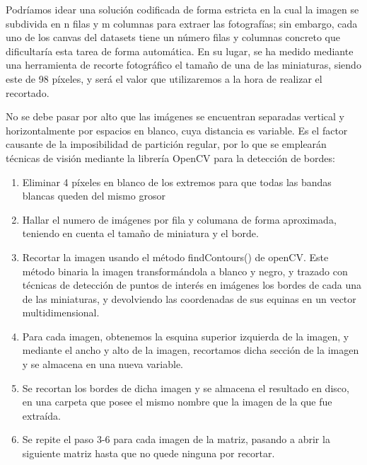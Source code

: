 Podríamos idear una solución codificada de forma estricta en la cual la imagen se subdivida en n filas y m columnas para extraer las fotografías; sin embargo, cada uno de los canvas del datasets tiene un número filas y columnas concreto que dificultaría esta tarea de forma automática. En su lugar, se ha medido mediante una herramienta de recorte fotográfico el tamaño de una de las miniaturas, siendo este de 98 píxeles, y será el valor que utilizaremos a la hora de realizar el recortado.

No se debe pasar por alto que las imágenes se encuentran separadas vertical y horizontalmente por espacios en blanco, cuya distancia es variable. Es el factor causante de la imposibilidad de partición regular, por lo que se emplearán técnicas de visión mediante la librería OpenCV para la detección de bordes:

\begin{enumerate}
	\item Eliminar 4 píxeles en blanco de los extremos para que todas las bandas blancas queden del mismo grosor
	\item Hallar el numero de imágenes por fila y columana de forma aproximada, teniendo en cuenta el tamaño de miniatura y el borde.
	\item Recortar la imagen usando el método findContours() de openCV. Este método binaria la imagen transformándola a blanco y negro, y trazado con técnicas de detección de puntos de interés en imágenes los bordes de cada una de las miniaturas, y devolviendo las coordenadas de sus equinas en un vector multidimensional. 
	\item Para cada imagen, obtenemos la esquina superior izquierda de la imagen, y mediante el ancho y alto de la imagen, recortamos dicha sección de la imagen y se almacena en una nueva variable.
	\item Se recortan los bordes de dicha imagen y se almacena el resultado en disco, en una carpeta que posee el mismo nombre que la imagen de la que fue extraída.
	\item Se repite el paso 3-6 para cada imagen de la matriz, pasando a abrir la siguiente matriz hasta que no quede ninguna por recortar.
\end{enumerate}

